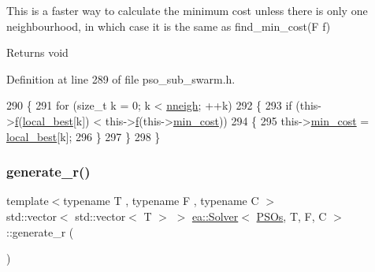 This is a faster way to calculate the minimum cost unless there is only one neighbourhood, in which case it is the same as find\+\_\+min\+\_\+cost(\+F f) 

\begin{DoxyReturn}{Returns}
void 
\end{DoxyReturn}


Definition at line 289 of file pso\+\_\+sub\+\_\+swarm.\+h.


\begin{DoxyCode}
290     \{
291         \textcolor{keywordflow}{for} (\textcolor{keywordtype}{size\_t} k = 0; k < \hyperlink{classea_1_1_solver_3_01_p_s_os_00_01_t_00_01_f_00_01_c_01_4_a92980b9d3411dd8855a6a050722ebcf7}{nneigh}; ++k)
292         \{
293             \textcolor{keywordflow}{if} (this->\hyperlink{classea_1_1_solver__base_ae0a893780c93dfe17c1d17301de6494f}{f}(\hyperlink{classea_1_1_solver_3_01_p_s_os_00_01_t_00_01_f_00_01_c_01_4_afa2eb13f0e5028ba4aa96f7e29b62e9c}{local\_best}[k]) < this->\hyperlink{classea_1_1_solver__base_ae0a893780c93dfe17c1d17301de6494f}{f}(this->\hyperlink{classea_1_1_solver__base_af745cded954be26280d842c1e7c7f989}{min\_cost}))
294             \{
295                 this->\hyperlink{classea_1_1_solver__base_af745cded954be26280d842c1e7c7f989}{min\_cost} = \hyperlink{classea_1_1_solver_3_01_p_s_os_00_01_t_00_01_f_00_01_c_01_4_afa2eb13f0e5028ba4aa96f7e29b62e9c}{local\_best}[k];
296             \}
297         \}
298     \}
\end{DoxyCode}
\mbox{\label{classea_1_1_solver_3_01_p_s_os_00_01_t_00_01_f_00_01_c_01_4_a01ea94eec2b6f05c62c9f83d725bb75b}} 
\subsubsection{\texorpdfstring{generate\+\_\+r()}{generate\_r()}}
{\footnotesize\ttfamily template$<$typename T , typename F , typename C $>$ \\
std\+::vector$<$ std\+::vector$<$ T $>$ $>$ \hyperlink{classea_1_1_solver}{ea\+::\+Solver}$<$ \hyperlink{structea_1_1_p_s_os}{P\+S\+Os}, T, F, C $>$\+::generate\+\_\+r (\begin{DoxyParamCaption}{ }\end{DoxyParamCaption})\hspace{0.3cm}{\ttfamily [private]}}



